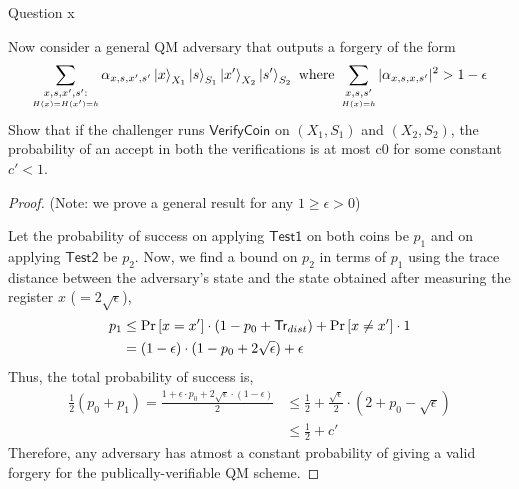 \begin{solution}{Question x}\label{ques:x}
    \begin{question}
        Now consider a general QM adversary that outputs a forgery of the form
        \begin{equation}
            \sum_{\underset{H(x) = H(x') = h}{x, s, x', s':}} \alpha_{x, s, x', s'}\ket{x}_{X_1}\ket{s}_{S_1}\ket{x'}_{X_2}\ket{s'}_{S_2}\text{ where }\sum_{\underset{H(x) = h}{x, s, s'}} |\alpha_{x, s, x, s'}|^2 > 1 - \epsilon
        \end{equation}
        Show that if the challenger runs $\mathsf{VerifyCoin}$ on $(X_1, S_1)$ and $(X_2, S_2)$, the probability of an accept in both the verifications is at most c0 for some constant $c' < 1$.
    \end{question}
    \tcblower{}
    \begin{proof}
        (Note: we prove a general result for any $1 \geq \epsilon > 0$)\par
        Let the probability of success on applying $\mathsf{Test1}$ on both coins be $p_1$ and on applying $\mathsf{Test2}$ be $p_2$. Now, we find a bound on $p_2$ in terms of $p_1$ using the trace distance between the adversary's state and the state obtained after measuring the register $x$ ($=2\sqrt{\epsilon}$), 
        \begin{equation}
            \begin{split}
                p_1 &\leq \Pr\left[ x = x' \right]\cdot\left(1 - p_0 + \mathsf{Tr}_{dist}\right) + \Pr\left[ x \neq x' \right]\cdot 1\\
                    &= (1 - \epsilon)\cdot(1 - p_0 + 2\sqrt{\epsilon}) + \epsilon
            \end{split}
        \end{equation}
        Thus, the total probability of success is,
        \begin{equation}
            \begin{split}
                \frac{1}{2}(p_0 + p_1) = \frac{1 + \epsilon\cdot p_0 + 2\sqrt{\epsilon}\cdot(1 - \epsilon)}{2}
                                      &\leq \frac{1}{2} + \frac{\sqrt{\epsilon}}{2}\cdot(2 + p_0 - \sqrt{\epsilon})\\
                                      &\leq \frac{1}{2} + c'
            \end{split}
        \end{equation}
        Therefore, any adversary has atmost a constant probability of giving a valid forgery for the publically-verifiable QM scheme.
    \end{proof}
\end{solution}
 
